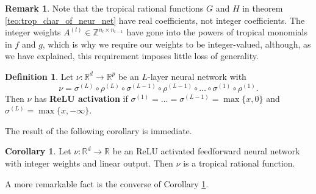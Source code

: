 \documentclass{article}
\theoremstyle{definition}
\newtheorem{corollary}[theorem]{Corollary}
\newtheorem{definition}[theorem]{Definition}
\newtheorem{remark}[theorem]{Remark}
\begin{document}
\begin{remark}\cite{zhang2018tropical}
Note that the tropical rational functions $G$ and $H$ in theorem \ref{teo:trop_char_of_neur_net} have real coefficients, not integer coefficients. The integer weights $A^{(l)} \in \mathbb{Z}^{n_l \times n_{l-1}}$ have gone into the powers of tropical monomials in $f$ and $g$, which is why we require our weights to be integer-valued, although, as we have explained, this requirement imposes little loss of generality.
\end{remark}

\begin{definition}
Let $\nu : \mathbb{R}^{d} \to \mathbb{R}^{p}$ be an $L$-layer neural network with
$$ \nu = \sigma^{(L)} \circ \rho^{(L)} \circ \sigma^{(L-1)} \circ \rho^{(L-1)} \circ \dots \circ \sigma^{(1)} \circ \rho^{(1)}.$$
Then $\nu$ has \textbf{ReLU activation} if 
$\sigma^{(1)} = \dots = \sigma^{(L-1)} = \max\{x, 0 \}$ and $\sigma^{(L)} = \max\{x, -\infty \}$.
\end{definition}
The result of the following corollary is immediate.
\begin{corollary}\cite{zhang2018tropical}
\label{cor:relu_trop_rat_fkt}
Let $\nu : \mathbb{R}^{d} \to \mathbb{R}$ be an ReLU activated feedforward neural network with integer weights and linear output. Then $\nu$ is a tropical rational function.
\end{corollary}

A more remarkable fact is the converse of Corollary \ref{cor:relu_trop_rat_fkt}.
\end{document}
